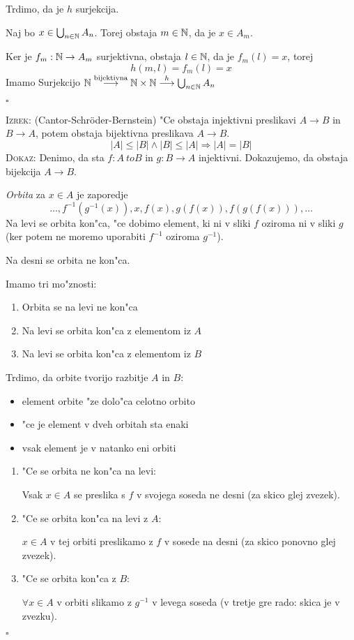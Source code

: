 Trdimo, da je $h$ surjekcija.

Naj bo $x \in \bigcup_{n \in \mathbb{N}} A_n$. Torej obstaja $m \in \mathbb{N}$, da je $x \in A_m$.

Ker je $f_m: \mathbb{N} \to A_m$ surjektivna, obstaja $l \in \mathbb{N}$, da je $f_m(l) = x$, torej
\begin{equation*}
h(m, l) = f_m(l) = x
\end{equation*}
Imamo Surjekcijo $\mathbb{N} \stackrel{\text{bijektivna}}{\longrightarrow} \mathbb{N} \times \mathbb{N} \stackrel{h}{\longrightarrow} \bigcup_{n \in \mathbb{N}} A_n$

\hfill $\square$

\textsc{Izrek:} (Cantor-Schr\"oder-Bernstein) "Ce obstaja injektivni preslikavi $A \to B$ in $B \to A$, potem obstaja bijektivna preslikava $A \to B$.
\begin{equation*}
|A| \leq |B| \land |B| \leq |A| \Rightarrow |A| = |B|
\end{equation*}
\textsc{Dokaz:} Denimo, da sta $f: A \ to B$ in $g: B \to A$ injektivni. Dokazujemo, da obstaja bijekcija $A \to B$.

\emph{Orbita} za $x \in A$ je zaporedje
\begin{equation*}
\ldots, f^{-1}\left(g^{-1}(x)\right), x, f(x), g(f(x)), f(g(f(x))), \ldots
\end{equation*}
Na levi se orbita kon"ca, "ce dobimo element, ki ni v sliki $f$ oziroma ni v sliki $g$ (ker potem ne moremo uporabiti $f^{-1}$ oziroma $g^{-1}$).

Na desni se orbita ne kon"ca.

Imamo tri mo"znosti:
\begin{enumerate}
	\item Orbita se na levi ne kon"ca
	\item Na levi se orbita kon"ca z elementom iz $A$
	\item Na levi se orbita kon"ca z elementom iz $B$
\end{enumerate}
Trdimo, da orbite tvorijo razbitje $A$ in $B$:
\begin{itemize}
	\item element orbite "ze dolo"ca celotno orbito
	\item "ce je element v dveh orbitah sta enaki
	\item vsak element je v natanko eni orbiti
\end{itemize}
\begin{enumerate}
	\item "Ce se orbita ne kon"ca na levi:
	
	Vsak $x \in A$ se preslika s $f$ v svojega soseda ne desni (za skico glej zvezek).
	\item "Ce se orbita kon"ca na levi z $A$:
	
	$x \in A$ v tej orbiti preslikamo z $f$ v sosede na desni (za skico ponovno glej zvezek).
	\item  "Ce se orbita kon"ca z $B$:
	
	$\forall x \in A$ v orbiti slikamo z $g^{-1}$ v levega soseda (v tretje gre rado: skica je v zvezku).
\end{enumerate}
\hfill $\square$